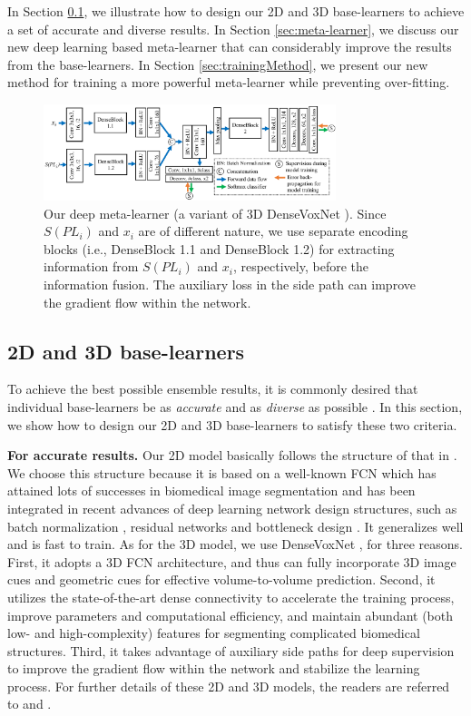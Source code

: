 \documentclass[letterpaper]{article}
\begin{document}
In Section \ref{sec:constructBL}, we illustrate how to design our 2D and 3D base-learners to achieve a set of accurate and diverse results. In Section \ref{sec:meta-learner}, we discuss our new deep learning based meta-learner that can considerably improve the results from the base-learners. In Section \ref{sec:trainingMethod}, we present our new method for training a more powerful meta-learner while preventing over-fitting.

\begin{figure}[ht]
  \centering
  \includegraphics[width=0.76\textwidth]{deep-meta-learner.pdf}
  \caption{Our deep meta-learner (a variant of 3D DenseVoxNet \cite{yu2017automatic}). Since $S(PL_i)$ and $x_i$ are of different nature, we use separate encoding blocks (i.e., DenseBlock 1.1 and DenseBlock 1.2) for extracting information from $S(PL_i)$ and $x_i$, respectively, before the information fusion. The auxiliary loss in the side path can improve the gradient flow within the network.}
\label{fig:dml}
\end{figure}

\subsection{2D and 3D base-learners}\label{sec:constructBL}
To achieve the best possible ensemble results, it is commonly desired that individual base-learners be as {\em accurate} and as {\em diverse} as possible \cite{zhou2012ensemble}. In this section, we show how to design our 2D and 3D base-learners to satisfy these two criteria.

\textbf{For accurate results.} Our 2D model basically follows the structure of that in \cite{yang2017suggestive}. We choose this structure because it is based on a well-known FCN \cite{chen2016dcan} which has attained lots of successes in biomedical image segmentation and has been integrated in recent advances of deep learning network design structures, such as batch normalization \cite{ioffe2015batch}, residual networks and bottleneck design \cite{he2016deep}. It generalizes well and is fast to train. As for the 3D model, we use DenseVoxNet \cite{yu2017automatic}, for three reasons.  First, it adopts a 3D FCN architecture, and thus can fully incorporate 3D image cues and geometric cues for effective volume-to-volume prediction. Second, it utilizes the state-of-the-art dense connectivity \cite{huang2017densely} to accelerate the training process, improve parameters and computational efficiency, and maintain abundant (both low- and high-complexity) features for segmenting complicated biomedical structures. Third, it takes advantage of auxiliary side paths for deep supervision \cite{dou20163d} to improve the gradient flow within the network and stabilize the learning process. For further details of these 2D and 3D models, the readers are referred to \cite{yang2017suggestive} and \cite{yu2017automatic}.
\end{document}
